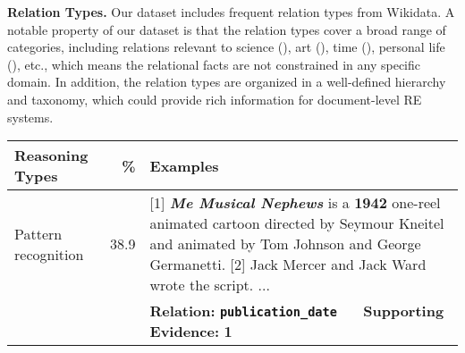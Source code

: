 \documentclass[11pt,a4paper]{article}
\begin{document}
\smallskip
\noindent
\textbf{Relation Types.}
Our dataset includes  frequent relation types from Wikidata. A notable property of our dataset is that the relation types cover a broad range of categories, including relations relevant to science (), art (), time (), personal life (), etc., which means the relational facts are not constrained in any specific domain. In addition, the relation types are organized in a well-defined hierarchy and taxonomy, which could provide rich information for document-level RE systems.  

\newcommand{\tabincell}[2]{\begin{tabular}{@{}#1@{}}#2\end{tabular}}
    \begin{table*}[htbp]
    \begin{center}
    \small
    \begin{tabular}{p{}  r p{}}
    \toprule
    Reasoning Types & \% & Examples\\
    \midrule
    Pattern recognition & 38.9 &  {\color{olive} [1]} {\color{blue} \textit{\textbf{Me Musical Nephews}}} is a {\color{blue_h} \textbf{1942}} one-reel animated cartoon directed by Seymour Kneitel and animated by Tom Johnson and George Germanetti. {\color{olive}[2] }Jack Mercer and Jack Ward wrote the script. ... \\
    & & \textbf{Relation:} {\color{rel} \textbf{\texttt{publication\_date}}} \ \ \, \; \qquad \qquad  \textbf{Supporting Evidence:} {\color{olive} \textbf{1}} \\
    

\end{tabular}
\end{center}
\end{table*}
\end{document}
